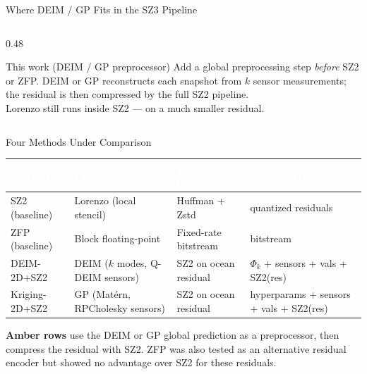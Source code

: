 \documentclass[aspectratio=169, 11pt]{beamer}
\begin{document}
\begin{frame}{Where DEIM / GP Fits in the SZ3 Pipeline}
\begin{columns}[T]
\begin{column}{0.48\textwidth}
  \begingroup
  \begin{block}{This work (DEIM / GP preprocessor)}
    \scriptsize
    Add a global preprocessing step \emph{before} SZ2 or ZFP.
    DEIM or GP reconstructs each snapshot from $k$ sensor measurements;
    the residual is then compressed by the full SZ2 pipeline.\\[3pt]
    Lorenzo still runs inside SZ2 --- on a much smaller residual.
  \end{block}
  \endgroup
\end{column}
\end{columns}
\end{frame}

\begin{frame}{Four Methods Under Comparison}
\small
\vspace{0.3em}

\renewcommand{\arraystretch}{1.4}
\scriptsize
\begin{tabular}{p{2.4cm} p{3.2cm} p{2.6cm} p{4.0cm}}
\toprule
\rowcolor{cnavy}
\textcolor{white}{\textbf{Method}} &
\textcolor{white}{\textbf{Predictor}} &
\textcolor{white}{\textbf{Residual encoder}} &
\textcolor{white}{\textbf{Stored bytes}} \\
\midrule
SZ2 (baseline)
  & Lorenzo (local stencil)
  & Huffman + Zstd
  & quantized residuals \\
\rowcolor{cice!40}
ZFP (baseline)
  & Block floating-point
  & Fixed-rate bitstream
  & bitstream \\
\midrule
\rowcolor{camber!20}
DEIM-2D+SZ2
  & DEIM ($k$ modes, Q-DEIM sensors)
  & SZ2 on ocean residual
  & $\Phi_k$ + sensors + vals + SZ2(res) \\
\rowcolor{camber!10}
Kriging-2D+SZ2
  & GP (Mat\'{e}rn, RPCholesky sensors)
  & SZ2 on ocean residual
  & hyperparams + sensors + vals + SZ2(res) \\
\bottomrule
\end{tabular}

\vspace{0.5em}
\small
\textcolor{camber}{\textbf{Amber rows}} use the DEIM or GP global prediction as a preprocessor, then compress the residual with SZ2. ZFP was also tested as an alternative residual encoder but showed no advantage over SZ2 for these residuals.
\end{frame}
\end{document}
